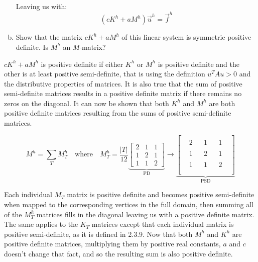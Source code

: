 \documentclass[10pt,letterpaper]{scrartcl}
\begin{document}
\begin{enumerate}[(a)]
\bigskip
Leaving us with:
\[\left(cK^h + aM^h\right) \vec{u}^h = \vec{f}^h\]
\mbox{}

\newpage
\item Show that the matrix $cK^h + aM^h$ of this linear system is symmetric positive definite. Is $M^h$ an $M$-matrix?
\end{enumerate}

$cK^h + aM^h$ is positive definite if either $K^h$ or $M^h$ is positive definite and the other is at least positive semi-definite, that is using the definition $u^TAu > 0$ and the distributive properties of matrices. It is also true that the sum of positive semi-definite matrices results in a positive definite matrix if there remains no zeros on the diagonal. It can now be shown that both $K^h$ and $M^h$ are both positive definite matrices resulting from the sums of positive semi-definite matrices.

\begin{equation*}
    M^h = \sum_T M_T^h \quad \text{where} \quad M_T^h = \frac{|T|}{12}
    \underbrace{\begin{bmatrix} 
    2 & 1 & 1 \\ 
    1 & 2 & 1 \\ 
    1 & 1 & 2 
    \end{bmatrix}}_\text{PD} \xrightarrow{} 
    \underbrace{\left[
    \begin{array}{cccccccc}
    & \\
    & 2 & & 1 & & 1 &\\
    & \\
    & 1 & & 2 & & 1 &\\
    & \\
    & 1 & & 1 & & 2 &\\
    &\\
    \end{array}
    \right]}_\text{PSD}
\end{equation*}

Each individual $M_T$ matrix is positive definite and becomes positive semi-definite when mapped to the corresponding vertices in the full domain, then summing all of the $M_T^h$ matrices fills in the diagonal leaving us with a positive definite matrix. The same applies to the $K_T$ matrices except that each individual matrix is positive semi-definite, as it is defined in 2.3.9. Now that both $M^h$ and $K^h$ are positive definite matrices, multiplying them by positive real constants, $a$ and $c$ doesn't change that fact, and so the resulting sum is also positive definite.
\end{document}
